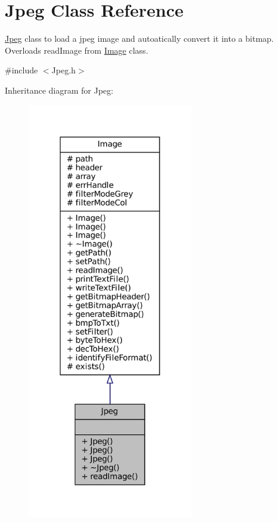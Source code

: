 \hypertarget{classJpeg}{}\section{Jpeg Class Reference}
\label{classJpeg}


\mbox{\hyperlink{classJpeg}{Jpeg}} class to load a jpeg image and autoatically convert it into a bitmap. Overloads read\+Image from \mbox{\hyperlink{classImage}{Image}} class.  




{\ttfamily \#include $<$Jpeg.\+h$>$}



Inheritance diagram for Jpeg\+:\nopagebreak
\begin{figure}[H]
\begin{center}
\leavevmode
\includegraphics[width=205pt]{classJpeg__inherit__graph}
\end{center}
\end{figure}


